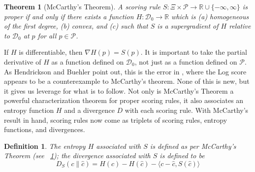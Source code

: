 \documentclass[12pt]{article}
\newtheorem{theorem}{Theorem}[section]
\newtheorem{definition}{Definition}[section]
\begin{document}
\begin{theorem}[McCarthy's Theorem] 
  \label{thm:lahpoodu}
  A scoring rule
  $S:\Xi\times\mathcal{P}\rightarrow\mathbb{R}\cup\{-\infty,\infty\}$
  is proper if and only if there exists a function
  $H:\mathcal{D}_{0}\rightarrow\mathbb{R}$ which is (a) homogeneous of
  the first degree, (b) convex, and (c) such that $S$ is a supergradient of
  $H$ relative to $\mathcal{D}_{0}$ at $p$ for all $p\in\mathcal{P}$.
\end{theorem}

If $H$ is differentiable, then $\nabla{}H(p)=S(p)$. It is important to
take the partial derivative of $H$ as a function defined on
$\mathcal{D}_{0}$, not just as a function defined on $\mathcal{P}$. As
Hendrickson and Buehler point out, this is the error in
, where the Log score appears to be a
counterexample to McCarthy's theorem. None of this is new, but it
gives us leverage for what is to follow. Not only is McCarthy's
Theorem a powerful characterization theorem for proper scoring rules,
it also associates an entropy function $H$ and a divergence $D$ with
each scoring rule. With McCarthy's result in hand, scoring rules now
come as triplets of scoring rules, entropy functions, and divergences.

\begin{definition}
  \label{def:logahpoh}
  The entropy $H$ associated with $S$ is defined as per McCarthy's
  Theorem (see {\heorem}~\ref{thm:lahpoodu}); the divergence associated
  with $S$ is defined to be
\begin{equation}
  \label{eq:reeshooz}
  D_{S}(c\|\hat{c})=H(c)-H(\hat{c})-\langle{}c-\hat{c},S(\hat{c})\rangle
\end{equation}
\end{definition}
\end{document}
